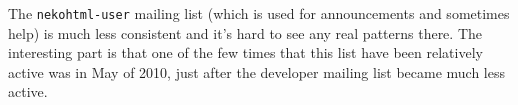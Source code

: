 The \texttt{nekohtml-user} mailing list (which is used for announcements and sometimes help) is much less consistent and it's hard to see any real patterns there.
The interesting part is that one of the few times that this list have been relatively active was in May of 2010, just after the developer mailing list became much less active.
